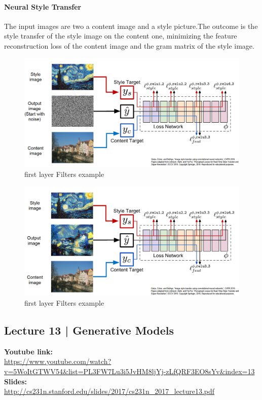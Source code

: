 \documentclass[11pt]{article}
\begin{document}
\paragraph{Neural Style Transfer}
The input images are two a content image and a style picture.The outcome is the style transfer of the style image on the content one, minimizing the feature reconstruction loss of the content image and the gram matrix of the style image.\\
\begin{minipage}{0.5\textwidth}
\begin{figure} [H]
\centering 
\includegraphics[scale=0.3]{L1117.pdf}
\caption{ first layer Filters example }
\label{fig:L1117}
\end{figure}
\end{minipage}
\begin{minipage}{0.5\textwidth}
\begin{figure} [H]
\centering 
\includegraphics[scale=0.3]{L1118.pdf}
\caption{ first layer Filters example }
\label{fig:L1118}
\end{figure}
\end{minipage}



\clearpage
\subsection{Lecture 13 | Generative Models}
\textbf{Youtube link:}\\
\url{https://www.youtube.com/watch?v=5WoItGTWV54&list=PL3FW7Lu3i5JvHM8ljYj-zLfQRF3EO8sYv&index=13}\\
\textbf{Slides:}\\
\url{http://cs231n.stanford.edu/slides/2017/cs231n_2017_lecture13.pdf}
\end{document}
